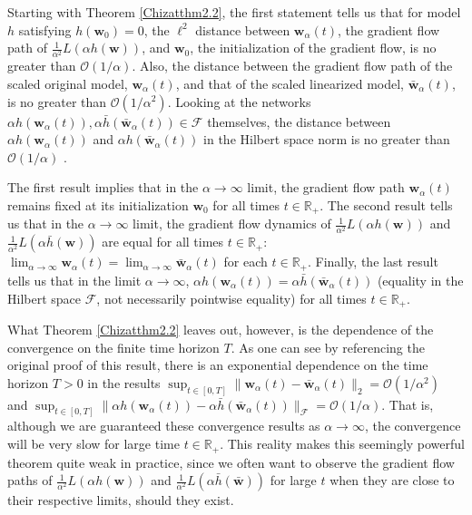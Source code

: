\documentclass{article}
\begin{document}
Starting with Theorem \ref{Chizatthm2.2}, the first statement tells us that for model $h$ satisfying $h(\boldsymbol{w}_0) = 0$, the $\ell^2$ distance between $\boldsymbol{w}_{\alpha}(t)$, the gradient flow path of $\frac{1}{\alpha^2} L(\alpha h(\boldsymbol{w}))$, and $\boldsymbol{w}_0$, the initialization of the gradient flow, is no greater than $\mathcal{O}(1/\alpha)$. Also, the distance between the gradient flow path of the scaled original model, $\boldsymbol{w}_{\alpha}(t)$, and that of the scaled linearized model, $\boldsymbol{\bar{w}}_{\alpha}(t)$, is no greater than $\mathcal{O}(1/\alpha^2)$. Looking at the networks $\alpha h(\boldsymbol{w}_{\alpha}(t)), \alpha \bar{h}(\boldsymbol{\bar{w}}_{\alpha}(t)) \in \mathcal{F}$ themselves, the distance between $\alpha h(\boldsymbol{w}_{\alpha}(t))$ and $\alpha h(\boldsymbol{\bar{w}}_{\alpha}(t))$ in the Hilbert space norm is no greater than $\mathcal{O}(1/\alpha)$ \cite{chizat2018lazy}. 

The first result implies that in the $\alpha \rightarrow \infty$ limit, the gradient flow path $\boldsymbol{w}_{\alpha}(t)$ remains fixed at its initialization $\boldsymbol{w}_0$ for all times $t \in \mathbb{R}_+$. The second result tells us that in the $\alpha \rightarrow \infty$ limit, the gradient flow dynamics of $\frac{1}{\alpha^2} L(\alpha h(\boldsymbol{w}))$ and $\frac{1}{\alpha^2} L(\alpha \bar{h}(\boldsymbol{w}))$ are equal for all times $t \in \mathbb{R}_+$: $\lim_{\alpha \to \infty} \boldsymbol{w}_{\alpha}(t) = \lim_{\alpha \to \infty} \boldsymbol{\bar{w}}_{\alpha}(t)$ for each $t \in \mathbb{R}_+$. Finally, the last result tells us that in the limit $\alpha \rightarrow \infty$, $\alpha h(\boldsymbol{w}_{\alpha}(t)) = \alpha \bar{h}(\boldsymbol{\bar{w}}_{\alpha}(t))$ (equality in the Hilbert space $\mathcal{F}$, not necessarily pointwise equality) for all times $t \in \mathbb{R}_+$.

What Theorem \ref{Chizatthm2.2} leaves out, however, is the dependence of the convergence on the finite time horizon $T$. As one can see by referencing the original proof of this result, there is an exponential dependence on the time horizon $T>0$ in the results $\sup_{t \in [0, T]} \| \boldsymbol{w}_{\alpha}(t) - \boldsymbol{\bar{w}}_{\alpha}(t) \|_2 = \mathcal{O}(1/\alpha^2)$ and $\sup_{t \in [0, T]} \| \alpha h(\boldsymbol{w}_{\alpha}(t)) - \alpha \bar{h}(\boldsymbol{\bar{w}}_{\alpha}(t)) \|_{\mathcal{F}} = \mathcal{O}(1/\alpha)$. That is, although we are guaranteed these convergence results as $\alpha \rightarrow \infty$, the convergence will be very slow for large time $t \in \mathbb{R}_+$. This reality makes this seemingly powerful theorem quite weak in practice, since we often want to observe the gradient flow paths of $\frac{1}{\alpha^2}L(\alpha h(\boldsymbol{w}))$ and $\frac{1}{\alpha^2}L(\alpha \bar{h}(\boldsymbol{\bar{w}}))$ for large $t$ when they are close to their respective limits, should they exist.
\end{document}
